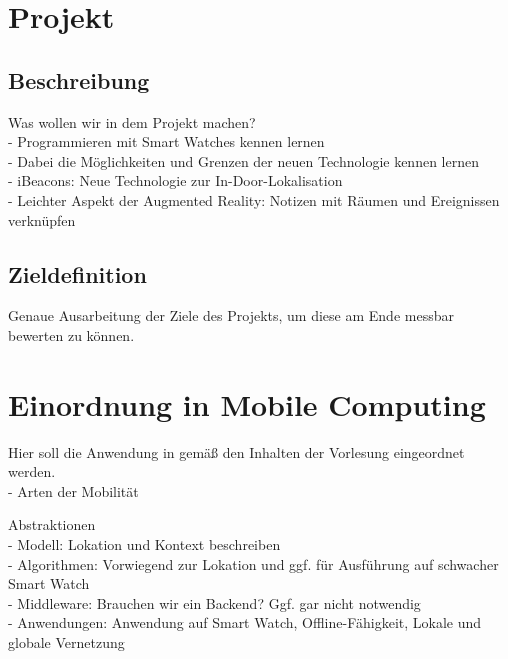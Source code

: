 



\setcounter{secnumdepth}{3}
\setcounter{tocdepth}{2}

\pagestyle{empty}


\tableofcontents
\setcounter{page}{1}

\pagestyle{scrheadings}

\newpage

\section{Projekt}

\subsection{Beschreibung}
Was wollen wir in dem Projekt machen?
\\- Programmieren mit Smart Watches kennen lernen
\\- Dabei die Möglichkeiten und Grenzen der neuen Technologie kennen lernen
\\- iBeacons: Neue Technologie zur In-Door-Lokalisation
\\- Leichter Aspekt der Augmented Reality: Notizen mit Räumen und Ereignissen verknüpfen

\subsection{Zieldefinition}
Genaue Ausarbeitung der Ziele des Projekts, um diese am Ende messbar bewerten zu können.

\section{Einordnung in Mobile Computing}
Hier soll die Anwendung in gemäß den Inhalten der Vorlesung eingeordnet werden.
\\- Arten der Mobilität

Abstraktionen
\\- Modell: Lokation und Kontext beschreiben
\\- Algorithmen: Vorwiegend zur Lokation und ggf. für Ausführung auf schwacher Smart Watch
\\- Middleware: Brauchen wir ein Backend? Ggf. gar nicht notwendig
\\- Anwendungen: Anwendung auf Smart Watch, Offline-Fähigkeit, Lokale und globale Vernetzung

